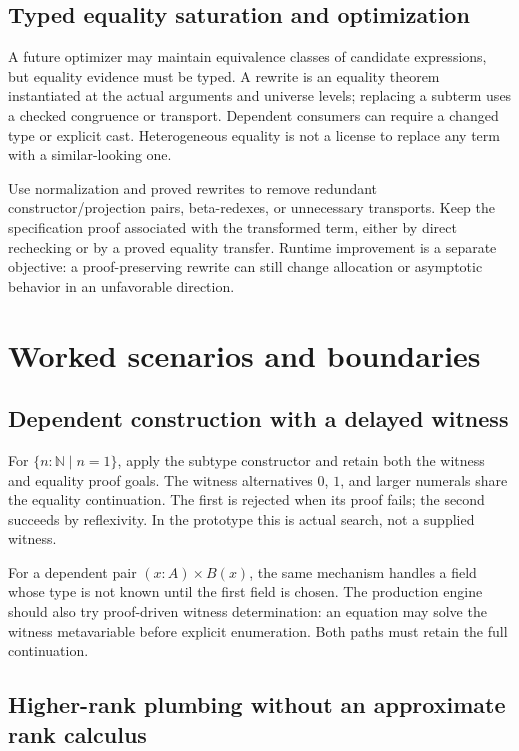 \subsection{Typed equality saturation and optimization}

A future optimizer may maintain equivalence classes of candidate expressions, but equality evidence must be typed. A rewrite is an equality theorem instantiated at the actual arguments and universe levels; replacing a subterm uses a checked congruence or transport. Dependent consumers can require a changed type or explicit cast. Heterogeneous equality is not a license to replace any term with a similar-looking one.

Use normalization and proved rewrites to remove redundant constructor/projection pairs, beta-redexes, or unnecessary transports. Keep the specification proof associated with the transformed term, either by direct rechecking or by a proved equality transfer. Runtime improvement is a separate objective: a proof-preserving rewrite can still change allocation or asymptotic behavior in an unfavorable direction.

\section{Worked scenarios and boundaries}
\label{sec:scenarios}

\subsection{Dependent construction with a delayed witness}

For $\{n:\mathbb N\mid n=1\}$, apply the subtype constructor and retain both the witness and equality proof goals. The witness alternatives $0$, $1$, and larger numerals share the equality continuation. The first is rejected when its proof fails; the second succeeds by reflexivity. In the prototype this is actual search, not a supplied witness.

For a dependent pair $(x:A)\times B(x)$, the same mechanism handles a field whose type is not known until the first field is chosen. The production engine should also try proof-driven witness determination: an equation may solve the witness metavariable before explicit enumeration. Both paths must retain the full continuation.

\subsection{Higher-rank plumbing without an approximate rank calculus}


